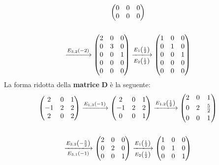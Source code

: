 \documentclass[a4paper]{article}
\makeatletter
\newenvironment{rowequmat}[1]{\left(\array{@{}#1@{}}}{\endarray\right)}
\makeatother
\begin{document}
\begin{gather*}
\begin{rowequmat}{ccc}
			0 & 0 & 0 \\ 
			0 & 0 & 0
		\end{rowequmat} \\
		\\
		\xlongrightarrow{E_{3,2}\left(-2\right)}
		\begin{rowequmat}{ccc}
			2 & 0 & 0 \\ 
			0 & 3 & 0 \\ 
			0 & 0 & 1 \\ 
			0 & 0 & 0 \\ 
			0 & 0 & 0
		\end{rowequmat} \xlongrightarrow[E_{2}\left(\frac{1}{3}\right)]{E_{1}\left(\frac{1}{2}\right)}
		\begin{rowequmat}{ccc}
			1 & 0 & 0 \\ 
			0 & 1 & 0 \\ 
			0 & 0 & 1 \\ 
			0 & 0 & 0 \\ 
			0 & 0 & 0
		\end{rowequmat}
	\end{gather*}
	La forma ridotta della \textbf{matrice} $\boldsymbol{D}$ è la seguente:
	\begin{gather*}
		\begin{rowequmat}{ccc}
			2  & 0  & 1 \\
			-1 & 2 & 2 	\\
			2  & 0  & 2
		\end{rowequmat} \xlongrightarrow{E_{1,3}\left(-1\right)}
		\begin{rowequmat}{ccc}
			2  & 0  & 1 \\
			-1 & 2 & 2 	\\
			0  & 0  & 1
		\end{rowequmat} \xlongrightarrow{E_{1,2}\left(\frac{1}{2}\right)}
		\begin{rowequmat}{ccc}
			2  & 0  & 1 \\ [0.3em]
			0  & 2  & \frac{5}{2} \\ [0.3em]
			0  & 0  & 1
		\end{rowequmat} \\
		\\
		\xlongrightarrow[E_{3,1}\left(-1\right)]{E_{3,2}\left(-\frac{5}{2}\right)}
		\begin{rowequmat}{ccc}
			2  & 0  & 0 \\ 
			0  & 2  & 0 \\ 
			0  & 0  & 1
		\end{rowequmat} \xlongrightarrow[E_{2}\left(\frac{1}{2}\right)]{E_{1}\left(\frac{1}{2}\right)}
		\begin{rowequmat}{ccc}
			1  & 0  & 0 \\ 
			0  & 1  & 0 \\ 
			0  & 0  & 1
		\end{rowequmat}
	\end{gather*}\newpage
	
\end{document}
